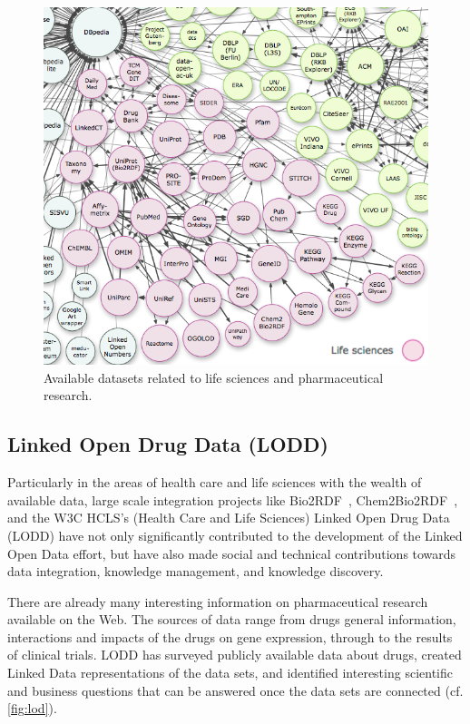 \documentclass[journal]{IEEEtran}
\begin{document}
\begin{figure}[tb]
	\centering
		\includegraphics[width=1.0\columnwidth]{images/lod_cloud.png}
	\caption{Available datasets related to life sciences and pharmaceutical research.}
	\label{fig:lod}
\end{figure}

\subsection{Linked Open Drug Data (LODD)}
Particularly in the areas of health care and life sciences with the wealth of available data, large scale integration projects like Bio2RDF~\cite{bio2rdf}, Chem2Bio2RDF~\cite{chembio}, and the W3C HCLS’s (Health Care and Life Sciences) Linked Open Drug Data (LODD)\cite{lodd} have not only significantly contributed to the development of the Linked Open Data effort, but have also made social and technical contributions towards data integration, knowledge management, and knowledge discovery.

There are already many interesting information on pharmaceutical research available on the Web.
The sources of data range from drugs general information, interactions and impacts of the drugs on gene expression, through to the results of clinical trials.
LODD\cite{lodrug} has surveyed publicly available data about drugs, created Linked Data representations of the data sets, and identified interesting scientific and business questions that can be answered once the data sets are connected (cf. \autoref{fig:lod}).
\end{document}
